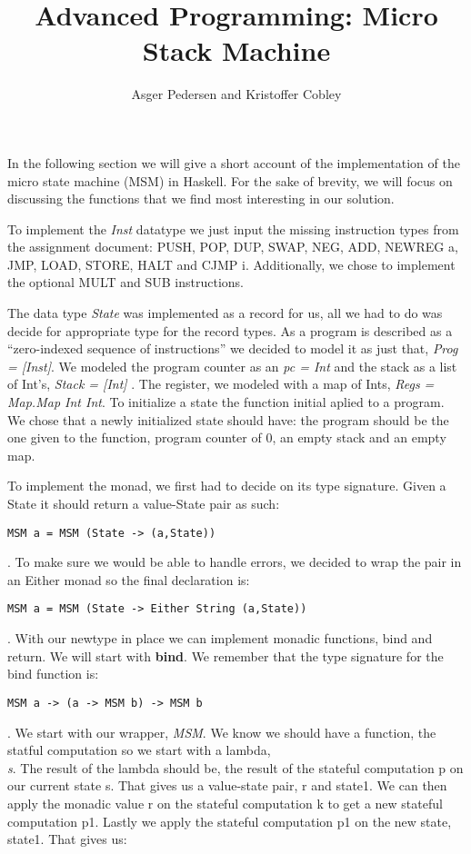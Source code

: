 \documentclass[]{article}
\title{Advanced Programming: Micro Stack Machine}
\author{ Asger Pedersen and Kristoffer Cobley}
\begin{document}
\ifpdf
{}
\else
{}
\fi

\maketitle
\setcounter{tocdepth}{1}
\tableofcontents
\newpage
In the following section we will give a short account of the implementation of the micro state machine (MSM) in Haskell. For the sake of brevity, we will focus on discussing the functions that we find most interesting in our solution.\par
To implement the \emph{Inst} datatype we just input the missing instruction types from the assignment document: PUSH, POP, DUP, SWAP, NEG, ADD, NEWREG a, JMP, LOAD, STORE, HALT and CJMP i. Additionally, we chose to implement the optional MULT and SUB instructions. \par
The data type \emph{State} was implemented as a record for us, all we had to do was decide for appropriate type for the record types. As a program is described as a “zero-indexed sequence of instructions” we decided to model it as just that, \emph{Prog = [Inst]}. We modeled the program counter as an \emph{pc = Int} and the stack as a list of Int’s, \emph{Stack = [Int] }. The register, we modeled with a map of Ints, \emph{Regs = Map.Map Int Int}. 
To initialize a state the function initial aplied to a program. We chose that a newly initialized state should have: the program should be the one given to the function, program counter of 0, an empty stack and an empty map.\par
To implement the monad, we first had to decide on its type signature. Given a State it should return a value-State pair as such: \begin{verbatim}MSM a = MSM (State -> (a,State))\end{verbatim}. To make sure we would be able to handle errors, we decided to wrap the pair in an Either monad so the final declaration is: \begin{verbatim}MSM a = MSM (State -> Either String (a,State))\end{verbatim}.
With our newtype in place we can implement monadic functions, bind and return. 
We will start with \textbf{bind}. We remember that the type signature for the bind function is: 
\begin{verbatim}MSM a -> (a -> MSM b) -> MSM b\end{verbatim}. We start with our wrapper, \emph{MSM}. We know we should have a function, the statful computation so we start with a lambda, \emph{\\s}. The result of the lambda should be, the result of the stateful computation p on our current state s. That gives us a value-state pair, r and state1. We can then apply the monadic value r on the stateful computation k to get a new stateful computation p1. Lastly we apply the stateful computation p1 on the new state, state1. That gives us: 
\end{document}

